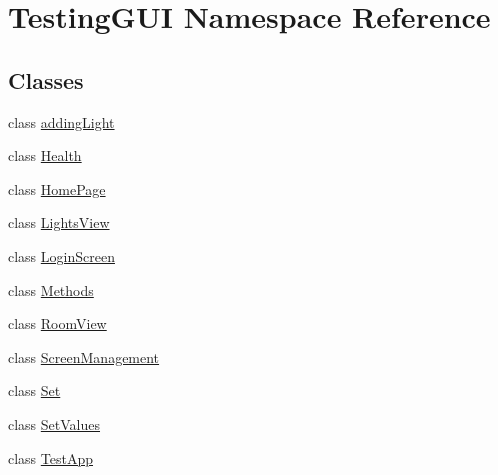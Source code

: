 \hypertarget{namespaceTestingGUI}{}\section{Testing\+G\+UI Namespace Reference}
\label{namespaceTestingGUI}
\subsection*{Classes}
\begin{DoxyCompactItemize}
\item 
class \hyperlink{classTestingGUI_1_1addingLight}{adding\+Light}
\item 
class \hyperlink{classTestingGUI_1_1Health}{Health}
\item 
class \hyperlink{classTestingGUI_1_1HomePage}{Home\+Page}
\item 
class \hyperlink{classTestingGUI_1_1LightsView}{Lights\+View}
\item 
class \hyperlink{classTestingGUI_1_1LoginScreen}{Login\+Screen}
\item 
class \hyperlink{classTestingGUI_1_1Methods}{Methods}
\item 
class \hyperlink{classTestingGUI_1_1RoomView}{Room\+View}
\item 
class \hyperlink{classTestingGUI_1_1ScreenManagement}{Screen\+Management}
\item 
class \hyperlink{classTestingGUI_1_1Set}{Set}
\item 
class \hyperlink{classTestingGUI_1_1SetValues}{Set\+Values}
\item 
class \hyperlink{classTestingGUI_1_1TestApp}{Test\+App}
\end{DoxyCompactItemize}
